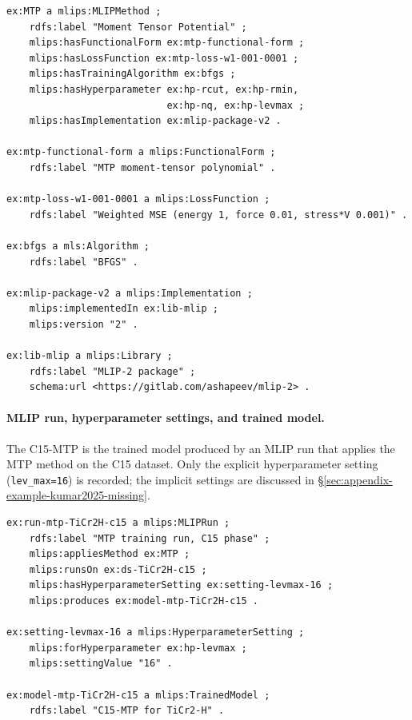\begin{lstlisting}[language=turtle,caption={Method, training algorithm, and implementation.}]
ex:MTP a mlips:MLIPMethod ;
    rdfs:label "Moment Tensor Potential" ;
    mlips:hasFunctionalForm ex:mtp-functional-form ;
    mlips:hasLossFunction ex:mtp-loss-w1-001-0001 ;
    mlips:hasTrainingAlgorithm ex:bfgs ;
    mlips:hasHyperparameter ex:hp-rcut, ex:hp-rmin,
                            ex:hp-nq, ex:hp-levmax ;
    mlips:hasImplementation ex:mlip-package-v2 .

ex:mtp-functional-form a mlips:FunctionalForm ;
    rdfs:label "MTP moment-tensor polynomial" .

ex:mtp-loss-w1-001-0001 a mlips:LossFunction ;
    rdfs:label "Weighted MSE (energy 1, force 0.01, stress*V 0.001)" .

ex:bfgs a mls:Algorithm ;
    rdfs:label "BFGS" .

ex:mlip-package-v2 a mlips:Implementation ;
    mlips:implementedIn ex:lib-mlip ;
    mlips:version "2" .

ex:lib-mlip a mlips:Library ;
    rdfs:label "MLIP-2 package" ;
    schema:url <https://gitlab.com/ashapeev/mlip-2> .
\end{lstlisting}

\paragraph{MLIP run, hyperparameter settings, and trained model.}
The C15-MTP is the trained model produced by an MLIP run that applies
the MTP method on the C15 dataset. Only the explicit hyperparameter
setting (\texttt{lev\_max=16}) is recorded; the implicit settings are
discussed in \S\ref{sec:appendix-example-kumar2025-missing}.

\begin{lstlisting}[language=turtle,caption={MLIP run, hyperparameter settings, and trained model.}]
ex:run-mtp-TiCr2H-c15 a mlips:MLIPRun ;
    rdfs:label "MTP training run, C15 phase" ;
    mlips:appliesMethod ex:MTP ;
    mlips:runsOn ex:ds-TiCr2H-c15 ;
    mlips:hasHyperparameterSetting ex:setting-levmax-16 ;
    mlips:produces ex:model-mtp-TiCr2H-c15 .

ex:setting-levmax-16 a mlips:HyperparameterSetting ;
    mlips:forHyperparameter ex:hp-levmax ;
    mlips:settingValue "16" .

ex:model-mtp-TiCr2H-c15 a mlips:TrainedModel ;
    rdfs:label "C15-MTP for TiCr2-H" .
\end{lstlisting}

